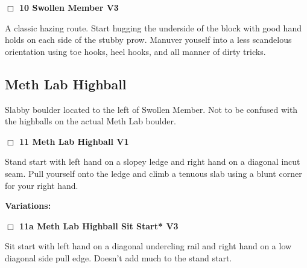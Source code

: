 \begin{multicols}{2}
\needspace{1.5cm}
\label{rt:Swollen Member}
\colorbox{green!20}{
\parbox{0.95\linewidth}{
\hspace{-1ex}\textbf{$\Box$
10 Swollen Member V3  
}}}
\begin{adjustwidth}{1.3em}{}			
A classic hazing route. Start hugging the underside of the block with good hand holds on each side of the stubby prow. Manuver youself into a less scandelous orientation using toe hooks, heel hooks, and  all manner of dirty tricks.
\end{adjustwidth}





\needspace{1.5cm}
\subsection*{Meth Lab Highball}\label{bf:Meth Lab Highball}
Slabby boulder located to the left of Swollen Member. Not to be confused with the highballs on the actual Meth Lab boulder.\\
	


\needspace{1.5cm}
\label{rt:Meth Lab Highball}
\colorbox{green!20}{
\parbox{0.95\linewidth}{
\hspace{-1ex}\textbf{$\Box$
11 Meth Lab Highball V1  \warn
}}}
\begin{adjustwidth}{1.3em}{}			
Stand start with left hand on a slopey ledge and right hand on a diagonal incut seam. Pull yourself onto the ledge and climb a tenuous slab using a blunt corner for your right hand.
\end{adjustwidth}


\begin{adjustwidth}{0.5cm}{}				
\needspace{3cm}
\textbf{Variations:} \newline

\needspace{1.5cm}
\label{vr:Meth Lab Highball Sit Start}
\colorbox{green!20}{
\parbox{0.95\linewidth}{
\hspace{-1ex}\textbf{$\Box$
11a Meth Lab Highball Sit Start* V3  
}}}
\begin{adjustwidth}{1.3em}{}			
Sit start with left hand on a diagonal undercling rail and right hand on a low diagonal side pull edge. Doesn't add much to the stand start.
\end{adjustwidth}



\end{adjustwidth}



\end{multicols}
